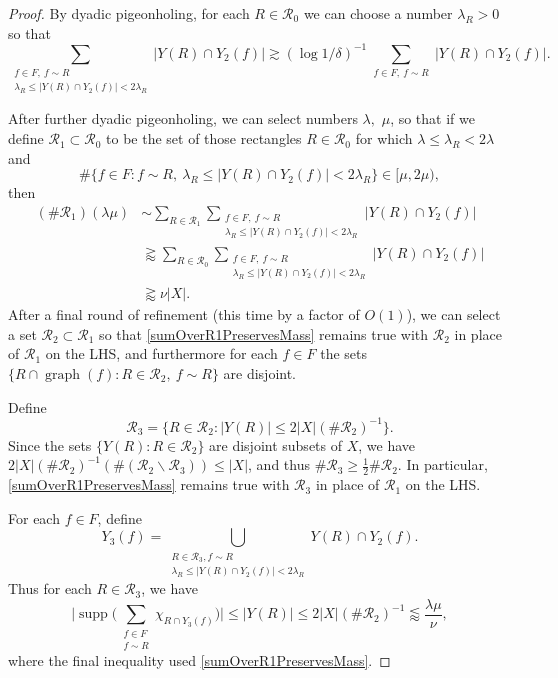 \documentclass[letterpaper, reqno,11pt]{article}
\numberwithin{equation}{section}
\numberwithin{thm}{section}
\theoremstyle{remark}
\begin{document}
\begin{proof}
By dyadic pigeonholing, for each $R\in\mathcal{R}_0$ we can choose a number $\lambda_R>0$ so that 
\[
\sum_{\substack{f\in F,\ f \sim R \\ \lambda_R \leq |Y(R)\cap Y_2(f)|<2\lambda_R}} |Y(R)\cap Y_2(f)| \gtrsim (\log 1/\delta)^{-1} 	\sum_{\substack{f\in F,\ f \sim R}}|Y(R)\cap Y_2(f)|.
\]

After further dyadic pigeonholing, we can select numbers $\lambda,$ $\mu$, so that if we define $\mathcal{R}_1\subset\mathcal{R}_0$ to be the set of those rectangles $R\in\mathcal{R}_0$ for which $\lambda\leq \lambda_R<2\lambda$ and
\begin{equation}\label{numberOfFSimMu}
 \#\{f\in F\colon f\sim R,\ \lambda_R \leq |Y(R)\cap Y_2(f)|<2\lambda_R\} \in [\mu,2\mu),
\end{equation}
then
\begin{equation}\label{sumOverR1PreservesMass}
\begin{split}
(\#\mathcal{R}_1)(\lambda \mu) & \sim \sum_{R\in\mathcal{R}_1} \sum_{\substack{f\in F,\ f \sim R \\ \lambda_R \leq |Y(R)\cap Y_2(f)|<2\lambda_R}} |Y(R)\cap Y_2(f)| \\
&\gtrapprox \sum_{R\in\mathcal{R}_0} \sum_{\substack{f\in F,\ f \sim R \\ \lambda_R \leq |Y(R)\cap Y_2(f)|<2\lambda_R}} |Y(R)\cap Y_2(f)|\\
&\gtrapprox \nu|X|.
\end{split}
\end{equation}
After a final round of refinement (this time by a factor of $O(1)$), we can select a set $\mathcal{R}_2\subset\mathcal{R}_1$ so that \eqref{sumOverR1PreservesMass} remains true with $\mathcal{R}_2$ in place of $\mathcal{R}_1$ on the LHS, and furthermore for each $f\in F$ the sets $\{R\cap \operatorname{graph}(f)\colon R\in\mathcal{R}_2,\ f\sim R\}$ are disjoint. 

Define 
\[
\mathcal{R}_3 = \{R\in\mathcal{R}_2\colon |Y(R)|\leq 2 |X|(\#\mathcal{R}_2)^{-1}\}.
\] 
Since the sets $\{Y(R)\colon R\in\mathcal{R}_2\}$ are disjoint subsets of $X$, we have $2|X|(\#\mathcal{R}_2)^{-1} (\#(\mathcal{R}_2\backslash\mathcal{R}_3)) \leq |X|$, and thus $\#\mathcal{R}_3\geq\frac{1}{2}\#\mathcal{R}_2$. In particular, \eqref{sumOverR1PreservesMass} remains true with $\mathcal{R}_3$ in place of $\mathcal{R}_1$ on the LHS. 

For each $f\in F$, define
\[
Y_3(f) = \bigcup_{\substack{R\in \mathcal{R}_3, f\sim R \\ \lambda_R \leq |Y(R)\cap Y_2(f)|< 2\lambda_R }} Y(R)\cap Y_2(f).
\]
Thus for each $R\in\mathcal{R}_3$, we have
\begin{equation}\label{suppBd}
\Big|\operatorname{supp}\Big(\sum_{\substack{f\in F \\ f\sim R}}\chi_{R\cap Y_3(f)}\Big)\Big| \leq |Y(R)|\leq 2 |X|(\#\mathcal{R}_2)^{-1} \lessapprox \frac{\lambda\mu}{\nu},
\end{equation}
where the final inequality used \eqref{sumOverR1PreservesMass}.



\end{proof}
\end{document}
